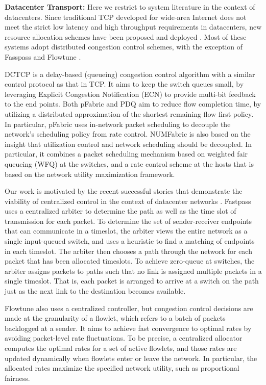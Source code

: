 \documentclass[ssy,preprint]{imsart_axv}
\numberwithin{equation}{section}
\theoremstyle{plain}
\theoremstyle{definition}
\theoremstyle{remark}
\theoremstyle{plain}
\theoremstyle{plain}
\begin{document}
\medskip
\noindent\textbf{Datacenter Transport:}
Here we restrict to system literature in the context of datacenters.
Since traditional TCP developed for wide-area Internet does not meet
the strict low latency and high throughput requirements in datacenters,
new resource allocation schemes have been proposed and deployed \cite{alizadeh2010DCTCP,alizadeh2013pfabric,nagaraj2016numfabric,hong2012pdq,perry17flowtune,perry2014fastpass}.
Most of these systems adopt distributed congestion control schemes,
with the exception of Fasspass \cite{perry2014fastpass} and Flowtune
\cite{perry17flowtune}.

DCTCP \cite{alizadeh2010DCTCP} is a delay-based (queueing) congestion
control algorithm with a similar control protocol as that in TCP. It aims to keep the switch queues small, by leveraging Explicit Congestion Notification (ECN) to provide multi-bit feedback to the end points. Both pFabric \cite{alizadeh2013pfabric} and
PDQ \cite{hong2012pdq} aim to reduce flow completion time, by utilizing
a distributed approximation of the shortest remaining flow first policy.
In particular, pFabric uses in-network packet scheduling to decouple
the network's scheduling policy from rate control. NUMFabric \cite{nagaraj2016numfabric}
is also based on the insight that utilization control and network
scheduling should be decoupled. In particular, it combines a packet
scheduling mechanism based on weighted fair queueing (WFQ) at the
switches, and a rate control scheme at the hosts that is based on
the network utility maximization framework.

Our work is motivated by the recent successful stories that demonstrate
the viability of centralized control in the context of datacenter
networks \cite{perry2014fastpass,perry17flowtune}. Fastpass \cite{perry2014fastpass}
uses a centralized arbiter to determine the path as well as the time
slot of transmission for each packet. To determine the set of sender-receiver
endpoints  that can communicate in a timeslot, the arbiter views
the entire network as a single input-queued switch, and uses a heuristic
to find a matching of endpoints in each timeslot. The arbiter then
chooses a path through the network for each packet that has been allocated
timeslots. To achieve zero-queue at switches, the arbiter assigns
packets to paths such that no link is assigned multiple packets in
a single timeslot. That is, each packet is arranged to arrive at a
switch on the path just as the next link to the destination becomes
available. 

Flowtune \cite{perry17flowtune} also uses a centralized controller,
but congestion control decisions are made at the granularity of a
flowlet, which refers to a batch of packets backlogged at a sender.
It aims to achieve fast convergence to optimal rates by avoiding packet-level
rate fluctuations. To be precise, a centralized allocator computes
the optimal rates for a set of active flowlets, and those rates are
updated dynamically when flowlets enter or leave the network. In particular,
the allocated rates maximize the specified network utility, such
as proportional fairness. 
\end{document}
